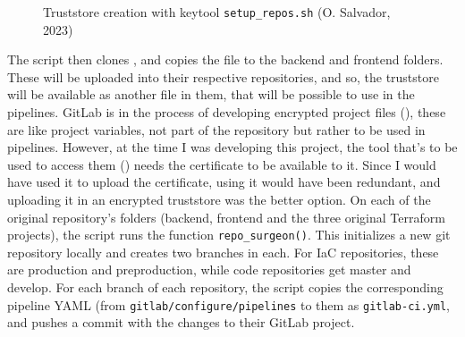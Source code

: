 \documentclass[11pt]{article}
\begin{document}
\begin{flushleft}
        \begin{figure}[htb]
            \centering
            \begin{subfigure}{.8\textwidth}
                \hspace{-5cm}
                \inputminted[fontsize=\scriptsize, firstline=134, lastline=135, linenos, frame=single, tabsize=1, breaklines]{bash}{../../gitlab/configure/setup-repos.sh}
              \end{subfigure}
            \caption{Truststore creation with keytool \texttt{setup\_repos.sh} (O. Salvador, 2023)}
        \end{figure}
    
    The script then clones \cite{misgit1}, and copies the file to the backend and frontend folders. These will be uploaded into their respective repositories, and so, the truststore will be available as another file in them, that will be possible to use in the pipelines. GitLab is in the process of developing encrypted project files (\cite{securefilesapi}), these are like project variables, not part of the repository but rather to be used in pipelines. However, at the time I was developing this project, the tool that's to be used to access them (\cite{downloadsecurefiles}) needs the certificate to be available to it. Since I would have used it to upload the certificate, using it would have been redundant, and uploading it in an encrypted truststore was the better option. On each of the original repository's folders (backend, frontend and the three original Terraform projects), the script runs the function \texttt{repo\_surgeon()}. This initializes a new git repository locally and creates two branches in each. For IaC repositories, these are production and preproduction, while code repositories get master and develop. For each branch of each repository, the script copies the corresponding pipeline YAML (from \texttt{gitlab/configure/pipelines} to them as \texttt{gitlab-ci.yml}, and pushes a commit with the changes to their GitLab project.
    \linebreak


\end{flushleft}
\end{document}
